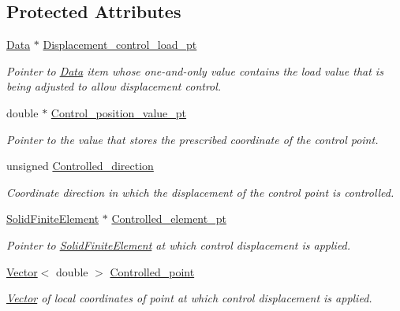 \subsection*{Protected Attributes}
\begin{DoxyCompactItemize}
\item 
\hyperlink{classoomph_1_1Data}{Data} $\ast$ \hyperlink{classoomph_1_1DisplacementControlElement_af63844ddb6481e7823e3612b1c18ca2c}{Displacement\+\_\+control\+\_\+load\+\_\+pt}
\begin{DoxyCompactList}\small\item\em Pointer to \hyperlink{classoomph_1_1Data}{Data} item whose one-\/and-\/only value contains the load value that is being adjusted to allow displacement control. \end{DoxyCompactList}\item 
double $\ast$ \hyperlink{classoomph_1_1DisplacementControlElement_a62143307494726baee841e58ac65516c}{Control\+\_\+position\+\_\+value\+\_\+pt}
\begin{DoxyCompactList}\small\item\em Pointer to the value that stores the prescribed coordinate of the control point. \end{DoxyCompactList}\item 
unsigned \hyperlink{classoomph_1_1DisplacementControlElement_ae458262d0fbd84eabea004ffc7026516}{Controlled\+\_\+direction}
\begin{DoxyCompactList}\small\item\em Coordinate direction in which the displacement of the control point is controlled. \end{DoxyCompactList}\item 
\hyperlink{classoomph_1_1SolidFiniteElement}{Solid\+Finite\+Element} $\ast$ \hyperlink{classoomph_1_1DisplacementControlElement_a4bfa9235640beace086529bf6136deae}{Controlled\+\_\+element\+\_\+pt}
\begin{DoxyCompactList}\small\item\em Pointer to \hyperlink{classoomph_1_1SolidFiniteElement}{Solid\+Finite\+Element} at which control displacement is applied. \end{DoxyCompactList}\item 
\hyperlink{classoomph_1_1Vector}{Vector}$<$ double $>$ \hyperlink{classoomph_1_1DisplacementControlElement_a7360dc9bd9b6752a060d04dcbe104186}{Controlled\+\_\+point}
\begin{DoxyCompactList}\small\item\em \hyperlink{classoomph_1_1Vector}{Vector} of local coordinates of point at which control displacement is applied. \end{DoxyCompactList}\item 

\end{DoxyCompactItemize}
